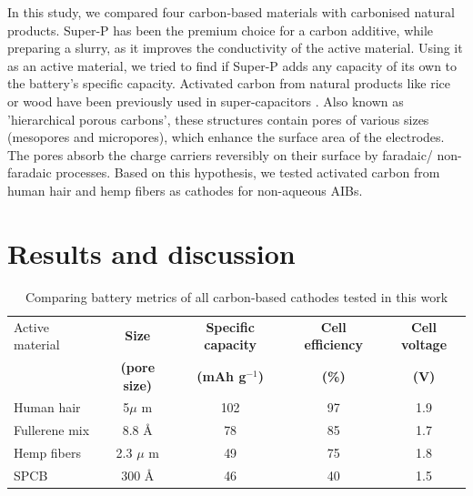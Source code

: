 \documentclass{article}
\begin{document}
In this study, we compared four carbon-based materials with carbonised natural products. Super-P has been the premium choice for a carbon additive, while preparing a slurry, as it improves the conductivity of the active material. Using it as an active material, we tried to find if Super-P adds any capacity of its own to the battery's specific capacity. Activated carbon from natural products like rice or wood have been previously used in super-capacitors \cite{hussain_development_2019, frackowiak_carbon_2001}. Also known as 'hierarchical porous carbons', these structures contain pores of various sizes (mesopores and micropores), which enhance the surface area of the electrodes. The pores absorb the charge carriers reversibly on their surface by faradaic/ non-faradaic processes. Based on this hypothesis, we tested activated carbon from human hair and hemp fibers as cathodes for non-aqueous AIBs. 

\section{Results and discussion}

\begin{table}[h!]
\caption{Comparing battery metrics of all carbon-based cathodes tested in this work} \label{table1}
\begin{center}
\begin{tabular}{|lcccc|}
\hline
Active material & {\textbf{Size}} & {\textbf{Specific capacity}} & {\textbf{Cell efficiency}} & {\textbf{Cell voltage}}\\
 & {\textbf{(pore size)}} & {\textbf{(mAh g$^{-1}$)}} & {\textbf{(\%)}} & {\textbf{(V)}}\\
\hline
Human hair & 5${\mu}$ m & 102 & 97 & 1.9 \\
Fullerene mix & 8.8 \AA & 78 & 85 & 1.7 \\
Hemp fibers & 2.3 $\mu$ m & 49 & 75 & 1.8 \\
SPCB & 300 \AA & 46 & 40 & 1.5 \\
\hline  %
\end{tabular}
\end{center}
\end{table}
\end{document}
